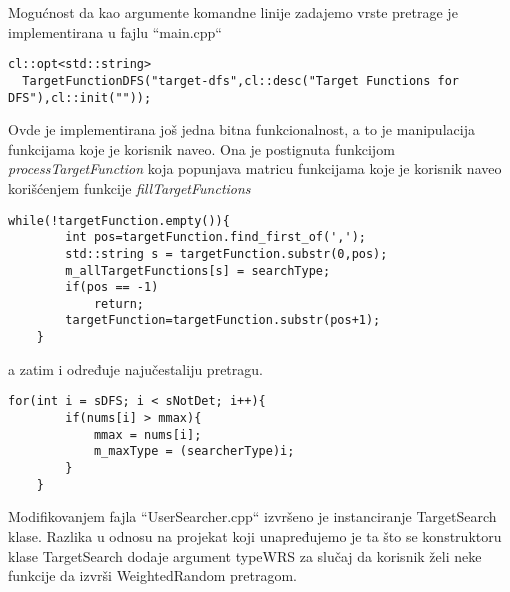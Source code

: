 \documentclass[a4paper]{article}
\begin{document}
Mogućnost da kao argumente komandne linije zadajemo vrste pretrage je implementirana u fajlu ``main.cpp`` 
\begin{lstlisting}[title={Definisanje imena pretrage za komandnu liniju}]
cl::opt<std::string>
  TargetFunctionDFS("target-dfs",cl::desc("Target Functions for DFS"),cl::init(""));
\end{lstlisting}
Ovde je implementirana još jedna bitna funkcionalnost, a to je manipulacija funkcijama koje je korisnik naveo. Ona je postignuta funkcijom \textit{processTargetFunction} koja popunjava matricu funkcijama koje je korisnik naveo korišćenjem funkcije \textit{fillTargetFunctions}
\begin{lstlisting}[title={Popunjavanje mape}]
    while(!targetFunction.empty()){
        int pos=targetFunction.find_first_of(',');
        std::string s = targetFunction.substr(0,pos);
        m_allTargetFunctions[s] = searchType;
        if(pos == -1)
            return;
        targetFunction=targetFunction.substr(pos+1);
    }
\end{lstlisting}

a zatim i određuje najučestaliju pretragu. 
\begin{lstlisting}[title={Određivanje najučestalije pretrage}]
    for(int i = sDFS; i < sNotDet; i++){
        if(nums[i] > mmax){
            mmax = nums[i];
            m_maxType = (searcherType)i;
        }
    }
\end{lstlisting}

Modifikovanjem fajla ``UserSearcher.cpp`` izvršeno je instanciranje TargetSearch klase. Razlika u odnosu na projekat koji unapređujemo je ta što se konstruktoru klase TargetSearch dodaje argument typeWRS za slučaj da korisnik želi neke funkcije da izvrši WeightedRandom pretragom.
\end{document}
